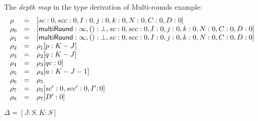 \documentclass[a4paper,11pt]{article}
\theoremstyle{definition}
\begin{document}
The \emph{depth map} in the type derivation of Multi-rounds example:
\[
\begin{array}{lll}
\rho     & = & [sc : 0, scc : 0, I : 0, j : 0, k : 0, N : 0, C: 0, D : 0] \\
\rho_0   & = & [\mathsf{multiRound}: \infty, () : \bot, sc : 0, scc : 0, I : 0, j : 0, k : 0, N : 0, C: 0, D : 0] \\
\rho_1   & = & [\mathsf{multiRound}: \infty, () : \bot, sc : 0, scc : 0, I : 0, j : 0, k : 0, N : 0, C: 0, D : 0] \\
\rho_2   & = & \rho_1[p : K - J]\\
\rho_3   & = & \rho_2[q : K - J]\\
\rho_4   & = & \rho_3[qc : 0]\\
\rho_5   & = & \rho_4[a : K - J - 1]\\
\rho_6   & = & \rho_5\\
\rho_7   & = & \rho_5[sc' : 0, scc' : 0, I' ; 0]\\
\rho_8   & = & \rho_7[D' : 0]\\
\end{array}
\]

$\Delta = [J : S, K : S]$


\newpage


\end{document}
